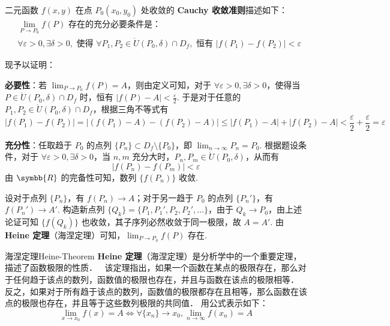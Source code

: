 \begin{myproof}
    二元函数 $f(x, y)$ 在点 $P_0(x_0, y_0)$ 处收敛的 \textbf{Cauchy 收敛准则}描述如下：
    \begin{equation}
        \boxed{
            \begin{aligned}
                 & \lim_{P \to P_0} f(P) \text{ 存在的充分必要条件是：}                                                                                                                     \\
                 & \forall \varepsilon > 0, \exists \delta > 0, \text{ 使得 } \forall P_1, P_2 \in \mathring{U}(P_0, \delta) \cap D_f, \text{ 恒有 } |f(P_1) - f(P_2)| < \varepsilon
            \end{aligned}
        }
    \end{equation}

    现予以证明：

    \textbf{必要性}：若 $\lim_{P \to P_0} f(P) = A$，则由定义可知，对于 $\forall \varepsilon > 0, \exists \delta > 0$，使得当 $P \in \mathring{U}(P_0, \delta) \cap D_f$ 时，恒有 $|f(P) - A| < \frac{\varepsilon}{2}$.
    于是对于任意的 $P_1, P_2 \in \mathring{U}(P_0, \delta) \cap D_f$，根据三角不等式有
    \begin{equation}
        |f(P_1) - f(P_2)| = |(f(P_1) - A) - (f(P_2) - A)| \le |f(P_1) - A| + |f(P_2) - A| < \frac{\varepsilon}{2} + \frac{\varepsilon}{2} = \varepsilon
    \end{equation}

    \textbf{充分性}：任取趋于 $P_0$ 的点列 $\{P_n\} \subset D_f \setminus \{P_0\}$，即 $\lim_{n \to \infty} P_n = P_0$.
    根据题设条件，对于 $\forall \varepsilon > 0, \exists \delta > 0$，当 $n, m$ 充分大时，$P_n, P_m \in \mathring{U}(P_0, \delta)$，从而有
    \begin{equation}
        |f(P_n) - f(P_m)| < \varepsilon
    \end{equation}
    由 $\symbb{R}$ 的完备性可知，数列 $\{f(P_n)\}$ 收敛.

    设对于点列 $\{P_n\}$，有 $f(P_n) \to A$；对于另一趋于 $P_0$ 的点列 $\{P_n'\}$，有 $f(P_n') \to A'$.
    构造新点列 $\{Q_k\} = \{P_1, P_1', P_2, P_2', \dots\}$，由于 $Q_k \to P_0$，由上述论证可知 $\{f(Q_k)\}$ 也收敛，其子序列必然收敛于同一极限，故 $A = A'$.
    由 \textbf{Heine 定理}（海涅定理）可知，$\lim_{P \to P_0} f(P)$ 存在.
\end{myproof}

\begin{note}{海涅定理}{Heine-Theorem}
    \textbf{Heine 定理}（海涅定理）是分析学中的一个重要定理，描述了函数极限的性质．{\emojifont 🤔😋}
    该定理指出，如果一个函数在某点的极限存在，那么对于任何趋于该点的数列，函数值的极限也存在，并且与函数在该点的极限相等．
    反之，如果对于所有趋于该点的数列，函数值的极限都存在且相等，那么函数在该点的极限也存在，并且等于这些数列极限的共同值．
    用公式表示如下：
    \begin{equation}
        \lim_{x \to x_0} f(x) = A \iff \forall \{x_n\} \to x_0, \lim_{n \to \infty} f(x_n) = A
    \end{equation}

\end{note}


